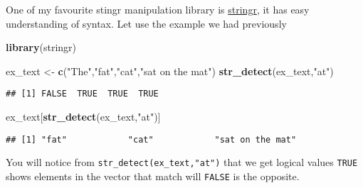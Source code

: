 \documentclass[ignorenonframetext,]{beamer}
\newenvironment{Shaded}{\begin{snugshade}}{\end{snugshade}}
\newcommand{\KeywordTok}[1]{\textcolor[rgb]{0.13,0.29,0.53}{\textbf{#1}}}
\newcommand{\NormalTok}[1]{#1}
\newcommand{\StringTok}[1]{\textcolor[rgb]{0.31,0.60,0.02}{#1}}
\begin{document}
\begin{frame}[fragile]

One of my favourite stingr manipulation library is
\href{https://stringr.tidyverse.org/}{stringr}, it has easy
understanding of syntax. Let use the example we had previously

\begin{Shaded}
\begin{Highlighting}[]
\KeywordTok{library}\NormalTok{(stringr)}

\NormalTok{ex_text <-}\StringTok{ }\KeywordTok{c}\NormalTok{(}\StringTok{"The"}\NormalTok{,}\StringTok{"fat"}\NormalTok{,}\StringTok{"cat"}\NormalTok{,}\StringTok{"sat on the mat"}\NormalTok{)}
\KeywordTok{str_detect}\NormalTok{(ex_text,}\StringTok{"at"}\NormalTok{)}
\end{Highlighting}
\end{Shaded}

\begin{verbatim}
## [1] FALSE  TRUE  TRUE  TRUE
\end{verbatim}

\begin{Shaded}
\begin{Highlighting}[]
\NormalTok{ex_text[}\KeywordTok{str_detect}\NormalTok{(ex_text,}\StringTok{"at"}\NormalTok{)]}
\end{Highlighting}
\end{Shaded}

\begin{verbatim}
## [1] "fat"            "cat"            "sat on the mat"
\end{verbatim}

You will notice from \texttt{str\_detect(ex\_text,"at")} that we get
logical values \texttt{TRUE} shows elements in the vector that match
will \texttt{FALSE} is the opposite.

\end{frame}
\end{document}

